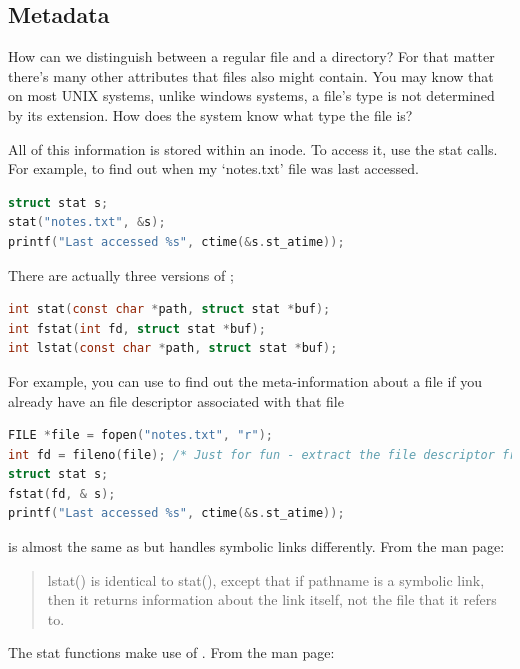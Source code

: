 \subsection{Metadata}

How can we distinguish between a regular file and a directory? For that matter there's many other attributes that files also might contain. You may know that on most UNIX systems, unlike windows systems, a file's type is not determined by its extension. How does the system know what type the file is?

All of this information is stored within an inode. To access it, use the stat calls. For example, to find out when my `notes.txt' file was last accessed.

\begin{lstlisting}[language=C]
struct stat s;
stat("notes.txt", &s);
printf("Last accessed %s", ctime(&s.st_atime));
\end{lstlisting}

There are actually three versions of ;

\begin{lstlisting}[language=C]
int stat(const char *path, struct stat *buf);
int fstat(int fd, struct stat *buf);
int lstat(const char *path, struct stat *buf);
\end{lstlisting}

For example, you can use  to find out the meta-information about a file if you already have an file descriptor associated with that file

\begin{lstlisting}[language=C]
FILE *file = fopen("notes.txt", "r");
int fd = fileno(file); /* Just for fun - extract the file descriptor from a C FILE struct */
struct stat s;
fstat(fd, & s);
printf("Last accessed %s", ctime(&s.st_atime));
\end{lstlisting}

 is almost the same as  but handles symbolic links differently. From the  man page:
\begin{quote}
lstat() is identical to stat(), except that if pathname is a symbolic link, then it returns information about the link itself, not the file that it refers to.
\end{quote}

The stat functions make use of . From the  man page:

